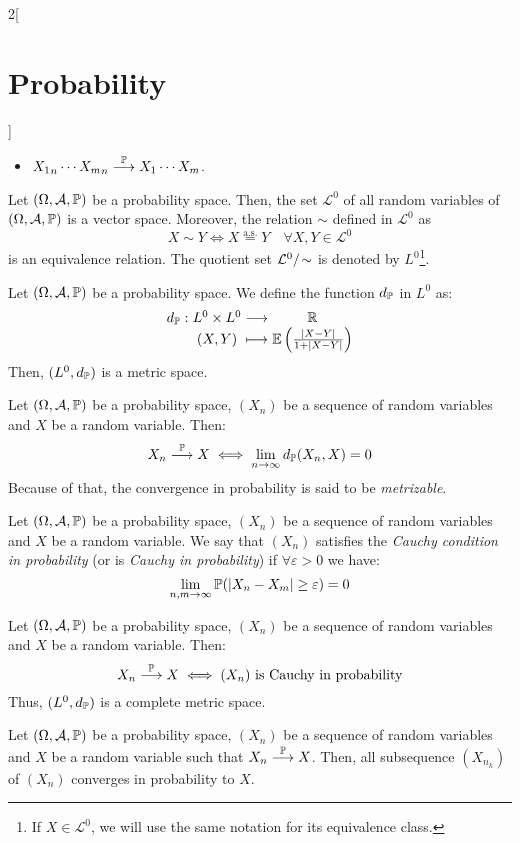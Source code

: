 \documentclass[../../../main_math.tex]{subfiles}
\begin{document}
\begin{multicols}{2}[\section{Probability}]
\begin{corollary}
\begin{itemize}
      \item ${X_1}_n\cdots{X_m}_n\overset{\mathbb{P}}{\longrightarrow}X_1\cdots X_m$.
    \end{itemize}
  \end{corollary}
  \begin{lemma}
    Let $(\Omega,\mathcal{A},\mathbb{P})$ be a probability space. Then, the set $\mathcal{L}^0$ of all random variables of $(\Omega,\mathcal{A},\mathbb{P})$ is a vector space. Moreover, the relation $\sim$ defined in $\mathcal{L}^0$ as $$X\sim Y\iff X\overset{\text{a.s.}}{=} Y\quad\forall X,Y\in\mathcal{L}^0$$ is an equivalence relation. The quotient set $\quot{\mathcal{L}^0}{\!\sim}$ is denoted by $L^0$\footnote{If $X\in\mathcal{L}^0$, we will use the same notation for its equivalence class.}.
  \end{lemma}
  \begin{proposition}
    Let $(\Omega,\mathcal{A},\mathbb{P})$ be a probability space. We define the function $d_{\mathbb{P}}$ in $L^0$ as:
    $$\function{d_\Prob}{L^0\times L^0}{\RR}{(X,Y)}{\Exp\left(\frac{|X-Y|}{1+|X-Y|}\right)}$$
    Then, $(L^0,d_{\mathbb{P}})$ is a metric space.
  \end{proposition}
  \begin{proposition}
    Let $(\Omega,\mathcal{A},\mathbb{P})$ be a probability space, $(X_n)$ be a sequence of random variables and $X$ be a random variable. Then:
    $$X_n\overset{\mathbb{P}}{\longrightarrow} X\iff\lim_{n\to\infty} d_{\mathbb{P}}(X_n,X)=0$$
    Because of that, the convergence in probability is said to be \emph{metrizable}.
  \end{proposition}
  \begin{definition}
    Let $(\Omega,\mathcal{A},\mathbb{P})$ be a probability space, $(X_n)$ be a sequence of random variables and $X$ be a random variable. We say that $(X_n)$ satisfies the \emph{Cauchy condition in probability} (or is \emph{Cauchy in probability}) if $\forall \varepsilon >0$ we have: $$\lim_{n,m\to\infty}\mathbb{P}(|X_n-X_m|\geq \varepsilon)=0$$
  \end{definition}
  \begin{proposition}
    Let $(\Omega,\mathcal{A},\mathbb{P})$ be a probability space, $(X_n)$ be a sequence of random variables and $X$ be a random variable. Then:
    $$X_n\overset{\mathbb{P}}{\longrightarrow} X\iff(X_n)\text{ is Cauchy in probability}$$
    Thus, $(L^0,d_{\mathbb{P}})$ is a complete metric space.
  \end{proposition}
  \begin{proposition}
    Let $(\Omega,\mathcal{A},\mathbb{P})$ be a probability space, $(X_n)$ be a sequence of random variables and $X$ be a random variable such that $X_n\overset{\mathbb{P}}{\longrightarrow} X$. Then, all subsequence $(X_{n_k})$ of $(X_n)$ converges in probability to $X$.
  \end{proposition}

\end{multicols}
\end{document}
